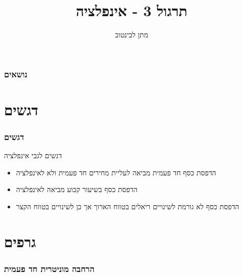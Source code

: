 \documentclass[10pt,usenames,dvipsnames]{beamer}
\title[אינפלציה]{תרגול 3 - אינפלציה}
\author{מתן לבינטוב}
\institute[{{אב"ג}}]{{ אוניברסיטת בן גוריון בנגב}}
\date{}
\begin{document}
\begin{RTL}
\begin{frame}
\titlepage
\end{frame}
\begin{frame}
    \frametitle{נושאים}
    \tableofcontents

    

\end{frame}

\section{דגשים}
\begin{frame}
    \frametitle{דגשים}
    \begin{block}{דגשים לגבי אינפלציה}
        \begin{itemize}
            \item הדפסת כסף חד פעמית מביאה לעליית מחירים חד פעמית ולא לאינפלציה
            \item הדפסת כסף בשיעור קבוע מביאה לאינפלציה
            \item הדפסת כסף לא גורמת לשינויים ריאלים בטווח הארוך אך כן לשינויים בטווח הקצר
        \end{itemize}
    \end{block}
    

\end{frame}

\section{גרפים}
\begin{frame}[allowframebreaks]
    \frametitle{הרחבה מוניטרית חד פעמית}
    \begin{center}
\end{center}
\end{frame}
\end{RTL}
\end{document}
